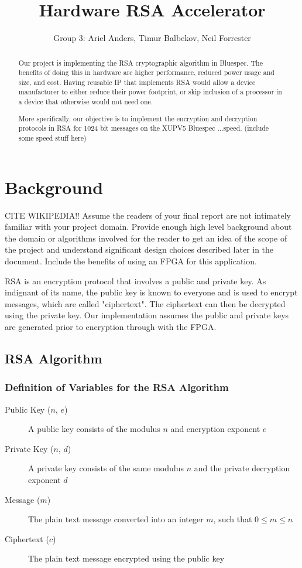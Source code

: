 \documentclass[a4paper,11pt]{report}
\title{Hardware RSA Accelerator}
\author{Group 3: Ariel Anders, Timur Balbekov, Neil Forrester}
\begin{document}
\maketitle
\tableofcontents

\begin{abstract}
Our project is implementing the RSA cryptographic algorithm in Bluespec.
The benefits of doing this in hardware are higher performance, reduced power usage and size, and cost.
Having reusable IP that implements RSA would allow a device manufacturer to either reduce their
power footprint, or skip inclusion of a processor in a device that otherwise would not need one.  

More specifically, our objective is to implement the encryption and decryption protocols in RSA for 1024 bit messages on the XUPV5 Bluespec ...speed.  (include some speed stuff here)
\end{abstract}
\chapter{Background}
CITE WIKIPEDIA!!
Assume the readers of your final report are not intimately familiar with your project
domain. Provide enough high level background about the domain or algorithms involved for
the reader to get an idea of the scope of the project and understand significant design choices
described later in the document.
Include the benefits of using an FPGA for this application.

RSA is an encryption protocol that involves a public and private key.  As indignant of its name, the public key is known to everyone and is used to encrypt messages, which are called "ciphertext".  The ciphertext can then be decrypted using the private key.  Our implementation assumes the public and private keys are generated prior to encryption through with the FPGA.    
\section{RSA Algorithm}
\subsection{Definition of Variables for the RSA Algorithm}
\begin{description}
\item[Public Key ($n$, $e$)] A public key consists of the modulus $n$ and encryption exponent $e$
\item[Private Key ($n$, $d$)]A  private key consists of the same modulus $n$ and the private decryption exponent $d$
\item[Message ($m$)] The plain text message converted into an integer $m$, such that $0 \leq m \leq n$ 
\item[Ciphertext ($c$)]  The plain text message encrypted using the public key
\end{description}
\end{document}
